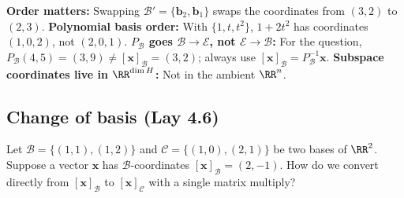 \documentclass[10pt]{scrartcl}
\newcommand{\vv}[1]{\mathbf{#1}}
\begin{document}
\begin{trapbox}
  \ii \textbf{Order matters:} Swapping $\mathcal B'=\{\vv b_2,\vv b_1\}$ swaps the coordinates from $(3,2)$ to $(2,3)$.
  \ii \textbf{Polynomial basis order:} With $\{1,t,t^2\}$, $1+2t^2$ has coordinates $(1,0,2)$, not $(2,0,1)$.
  \ii \textbf{$P_{\mathcal B}$ goes $\mathcal B\to\mathcal E$, not $\mathcal E\to\mathcal B$:} For the question, $P_{\mathcal B}(4,5)=(3,9)\neq[\vv x]_{\mathcal B}=(3,2)$; always use $[\vv x]_{\mathcal B}=P_{\mathcal B}^{-1}\vv x$.
  \ii \textbf{Subspace coordinates live in $\RR^{\dim H}$:} Not in the ambient $\RR^n$.
\end{trapbox}

\subsection{Change of basis (Lay 4.6)}

\begin{qbox}
  Let $\mathcal B=\{(1,1),(1,2)\}$ and $\mathcal C=\{(1,0),(2,1)\}$ be two bases of $\RR^2$. Suppose a vector $\vv x$ has $\mathcal B$-coordinates $[\vv x]_{\mathcal B}=(2,-1)$. How do we convert directly from $[\vv x]_{\mathcal B}$ to $[\vv x]_{\mathcal C}$ with a single matrix multiply?
\end{qbox}
\end{document}
